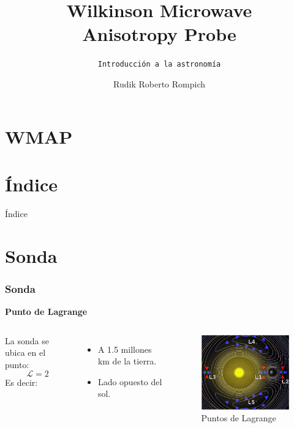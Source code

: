 \documentclass[UKenglish]{beamer}
\author{Rudik Roberto Rompich}
\title{Wilkinson Microwave\\ Anisotropy Probe}
\subtitle{\texttt{Introducción a la astronomía}}
\begin{document}
{
\section{WMAP}
\SectionPage 
\usebackgroundtemplate{ } 

\section{Índice}


%
%
\begin{frame}{Índice}
    \tableofcontents[currentsection]
\end{frame}


\section{Sonda}

\begin{frame}
\frametitle{Sonda}{\textbf{Punto de Lagrange}}

\begin{columns}

La sonda se ubica en el punto:
$$\mathcal{L}=2$$
Es decir: 

\begin{itemize}
\item A 1.5 millones km de la tierra.
\item Lado opuesto del sol.
\end{itemize}


  \begin{figure}[h!]
    \centering
    \includegraphics[scale=0.5]{lagrange.png}
    \caption{Puntos de Lagrange}
    \label{fig:punt4os}
    \end{figure}
\end{columns}
\end{frame}


}
\end{document}

